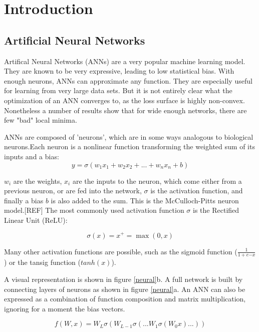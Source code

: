 \chapter{Introduction}
\section{Artificial Neural Networks}

Artifical Neural Networks (ANNs) are a very popular machine learning model. They are known to be very expressive, leading to low statistical bias. With enough neurons, ANNs can approximate any function.  They are especially useful for learning from very large data sets. But it is not entirely clear what the optimization of an ANN converges to, as the loss surface is highly non-convex. Nonetheless a number of results show that for wide enough networks, there are few "bad" local minima.

ANNs are composed of 'neurons', which are in some ways analogous to biological neurons.Each neuron is a nonlinear function transforming the weighted sum of its inputs and a bias:
\begin{equation}
      y = \sigma(w_1x_1+w_2x_2+...+w_nx_n + b)
\end{equation}

$w_i$ are the weights, $x_i$ are the inputs to the neuron, which come either from a previous neuron, or are fed into the network, $\sigma$ is the activation function, and finally a bias $b$ is also added to the sum. This is the McCulloch-Pitts neuron model.[REF] The most commonly used activation function $\sigma$ is the Rectified Linear Unit (ReLU):

\begin{equation}
      \sigma(x) = x^+ = \max(0,x)
\end{equation}

Many other activation functions are possible, such as the sigmoid function ($\frac{1}{1+e{-x}}$) or the tansig function ($tanh(x)$).

A visual representation is shown in figure \ref{neural}b. A full network is built by connecting layers of neurons as shown in figure \ref{neural}a. An ANN can also be expressed as a combination of function composition and matrix multiplication, ignoring for a moment the bias vectors.

\begin{equation}
         f(W,x) = W_L\sigma(W_{L-1}\sigma(...W_1\sigma(W_0x)...))
\end{equation}

